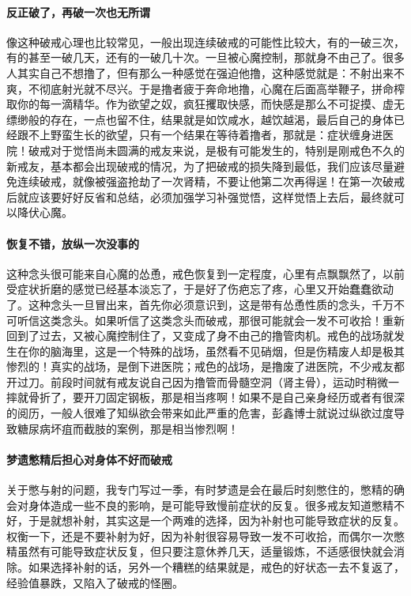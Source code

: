 \paragraph{反正破了，再破一次也无所谓} 像这种破戒心理也比较常见，一般出现连续破戒的可能性比较大，有的一破三次，有的甚至一破几天，还有的一破几十次。一旦被心魔控制，那就身不由己了。很多人其实自己不想撸了，但有那么一种感觉在强迫他撸，这种感觉就是：不射出来不爽，不彻底射光就不尽兴。于是撸者疲于奔命地撸，心魔在后面高举鞭子，拼命榨取你的每一滴精华。作为欲望之奴，疯狂攫取快感，而快感是那么不可捉摸、虚无缥缈般的存在，一点也留不住，结果就是如饮咸水，越饮越渴，最后自己的身体已经跟不上野蛮生长的欲望，只有一个结果在等待着撸者，那就是：症状缠身进医院！破戒对于觉悟尚未圆满的戒友来说，是极有可能发生的，特别是刚戒色不久的新戒友，基本都会出现破戒的情况，为了把破戒的损失降到最低，我们应该尽量避免连续破戒，就像被强盗抢劫了一次肾精，不要让他第二次再得逞！在第一次破戒后就应该要好好反省和总结，必须加强学习补强觉悟，这样觉悟上去后，最终就可以降伏心魔。

\paragraph{恢复不错，放纵一次没事的} 这种念头很可能来自心魔的怂恿，戒色恢复到一定程度，心里有点飘飘然了，以前受症状折磨的感觉已经基本淡忘了，于是好了伤疤忘了疼，心里又开始蠢蠢欲动了。这种念头一旦冒出来，首先你必须意识到，这是带有怂恿性质的念头，千万不可听信这类念头。如果听信了这类念头而破戒，那很可能就会一发不可收拾！重新回到了过去，又被心魔控制住了，又变成了身不由己的撸管肉机。戒色的战场就发生在你的脑海里，这是一个特殊的战场，虽然看不见硝烟，但是伤精废人却是极其惨烈的！真实的战场，是倒下进医院；戒色的战场，是撸废了进医院，不少戒友都开过刀。前段时间就有戒友说自己因为撸管而骨髓空洞（肾主骨），运动时稍微一摔就骨折了，要开刀固定钢板，那是相当疼啊！如果不是自己亲身经历或者有很深的阅历，一般人很难了知纵欲会带来如此严重的危害，彭鑫博士就说过纵欲过度导致糖尿病坏疽而截肢的案例，那是相当惨烈啊！

\paragraph{梦遗憋精后担心对身体不好而破戒} 关于憋与射的问题，我专门写过一季，有时梦遗是会在最后时刻憋住的，憋精的确会对身体造成一些不良的影响，是可能导致慢前症状的反复。很多戒友知道憋精不好，于是就想补射，其实这是一个两难的选择，因为补射也可能导致症状的反复。权衡一下，还是不要补射为好，因为补射很容易导致一发不可收拾，而偶尔一次憋精虽然有可能导致症状反复，但只要注意休养几天，适量锻炼，不适感很快就会消除。如果选择补射的话，另外一个糟糕的结果就是，戒色的好状态一去不复返了，经验值暴跌，又陷入了破戒的怪圈。

